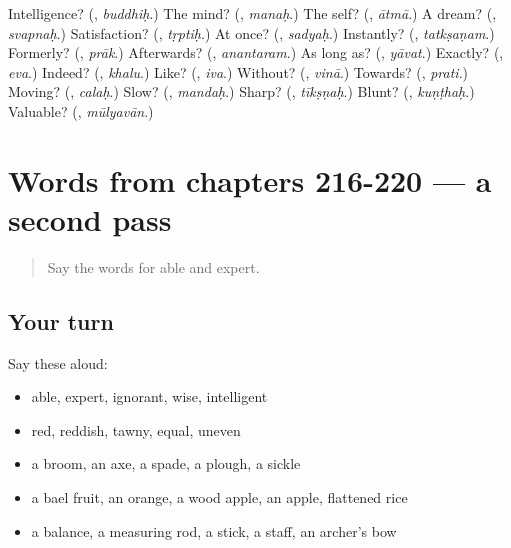 \begin{tcolorbox}[breakable,colback=teal!4,colframe=teal!35!black,title={Before you move on}]
Intelligence? (\textbf{}, \emph{buddhiḥ}.) The mind? (\textbf{}, \emph{manaḥ}.) The self? (\textbf{}, \emph{ātmā}.) A dream? (\textbf{}, \emph{svapnaḥ}.) Satisfaction? (\textbf{}, \emph{tṛptiḥ}.) At once? (\textbf{}, \emph{sadyaḥ}.) Instantly? (\textbf{}, \emph{tatkṣaṇam}.) Formerly? (\textbf{}, \emph{prāk}.) Afterwards? (\textbf{}, \emph{anantaram}.) As long as? (\textbf{}, \emph{yāvat}.) Exactly? (\textbf{}, \emph{eva}.) Indeed? (\textbf{}, \emph{khalu}.) Like? (\textbf{}, \emph{iva}.) Without? (\textbf{}, \emph{vinā}.) Towards? (\textbf{}, \emph{prati}.) Moving? (\textbf{}, \emph{calaḥ}.) Slow? (\textbf{}, \emph{mandaḥ}.) Sharp? (\textbf{}, \emph{tīkṣṇaḥ}.) Blunt? (\textbf{}, \emph{kuṇṭhaḥ}.) Valuable? (\textbf{}, \emph{mūlyavān}.)
\end{tcolorbox}
\section[(dialogue)]{Words from chapters 216-220 — a second pass}

\label{lesson:SA-R220-second-pass-words-from-chapters-216-220}



\begin{quote}
Say the words for able and expert.
\end{quote}

\subsection*{Your turn}
Say these aloud:

\begin{itemize}
\raggedright
  \item able, expert, ignorant, wise, intelligent
  \item red, reddish, tawny, equal, uneven
  \item a broom, an axe, a spade, a plough, a sickle
  \item a bael fruit, an orange, a wood apple, an apple, flattened rice
  \item a balance, a measuring rod, a stick, a staff, an archer's bow
\end{itemize}

